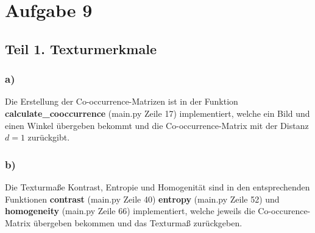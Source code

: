 \documentclass[12pt]{article}
\begin{document}

\section*{Aufgabe 9}
\subsection*{Teil 1. Texturmerkmale}
\subsubsection*{a)}
Die Erstellung der Co-occurrence-Matrizen ist in der Funktion \textbf{calculate\_cooccurrence} (main.py Zeile 17) implementiert, welche ein Bild und einen Winkel übergeben bekommt und die Co-occurrence-Matrix mit der Distanz $d = 1$ zurückgibt.

\subsubsection*{b)}
Die Texturmaße Kontrast, Entropie und Homogenität sind in den entsprechenden Funktionen \textbf{contrast} (main.py Zeile 40) \textbf{entropy} (main.py Zeile 52) und \textbf{homogeneity} (main.py Zeile 66) implementiert, welche jeweils die Co-occurence-Matrix übergeben bekommen und das Texturmaß zurückgeben.
\end{document}
